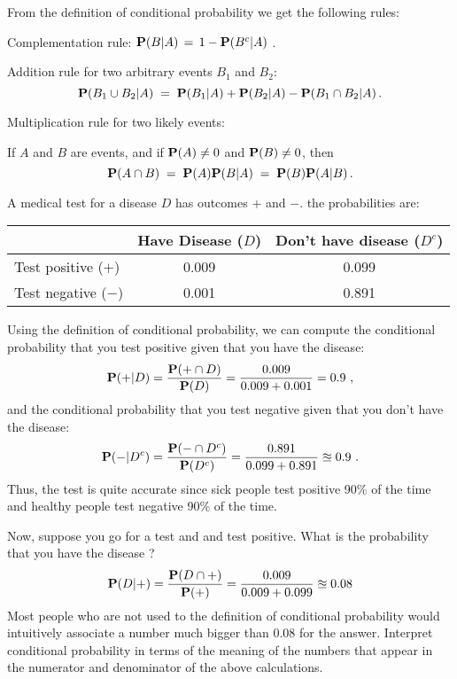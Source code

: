 From the definition of conditional probability we get the following rules:
\be
\item Complementation rule: $\mathbf{P}(B | A)\, = \,1 - \mathbf{P}(B^c | A)$ .

\item Addition rule for two arbitrary events $B_1$ and $B_2$: \[{\mathbf{P}(B_1 \cup B_2 | A) \;= \;\mathbf{P}(B_1 | A) + \mathbf{P}(B_2 | A) - \mathbf{P}(B_1\cap B_2|A)}\,.\]

\item Multiplication rule for two likely events: 

If $A$ and $B$ are events, and if
  $\mathbf{P}(A)\neq 0$ and  $\mathbf{P}(B)\neq 0$, then
\[\mathbf{P}(A\cap B)\;=\;\mathbf{P}(A)\mathbf{P}(B|A)\;=\;\mathbf{P}(B)\mathbf{P}(A|B)\,. \]
\ee

\begin{example}[Wasserman03, p.~11]
 A medical test for a disease $D$ has outcomes $+$ and $-$.  the probabilities are:
\begin{center}
 \begin{tabular}{l | c | c}
 \hline
 & Have Disease ($D$) & Don't have disease ($D^c$)  \\ \hline
Test positive ($+$) & 0.009 & 0.099 \\
 Test negative ($-$) & 0.001 & 0.891\\ \hline
 \end{tabular}
 \end{center}
 Using the definition of conditional probability, we can compute the conditional probability that you test positive given that you have the disease:
 \[
 \mathbf{P}(+ | D) = \frac{\mathbf{P}(+ \cap D)}{\mathbf{P}(D)} = \frac{0.009}{0.009+0.001}=0.9 \ ,
 \]
 and the conditional probability that you test negative given that you don't have the disease:
 \[
 \mathbf{P}(- | D^c) = \frac{\mathbf{P}(- \cap D^c)}{\mathbf{P}(D^c)} = \frac{0.891}{0.099+0.891} \approxeq 0.9 \ .
 \]
 Thus, the test is quite accurate since sick people test positive 90\% of the time and healthy people test negative 90\% of the time.
 
Now, suppose you go for a test and and test positive.  What is the probability that you have the disease ?
 \[
 \mathbf{P}(D|+) = \frac{\mathbf{P}(D \cap +)}{\mathbf{P}(+)} = \frac{0.009}{0.009+0.099} \approxeq 0.08
 \]
Most people who are not used to the definition of conditional probability would intuitively associate a number much bigger than $0.08$ for the answer.  Interpret conditional probability in terms of the meaning of the numbers that appear in the numerator and denominator of the above calculations.
\end{example}
 
